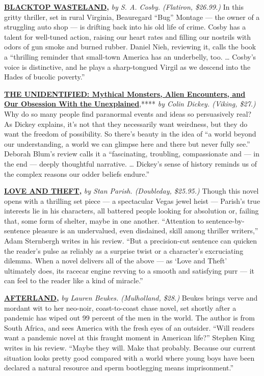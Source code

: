 \href{https://www.nytimes.com/2020/07/17/books/review/blacktop-wasteland-s-a-cosby.html}{\textbf{\textbf{BLACKTOP
WASTELAND}}}\textbf{\textbf{,}} \emph{by S. A. Cosby. (Flatiron,
\$26.99.)} In this gritty thriller, set in rural Virginia, Beauregard
``Bug'' Montage --- the owner of a struggling auto shop --- is drifting
back into his old life of crime. Cosby has a talent for well-tuned
action, raising our heart rates and filling our nostrils with odors of
gun smoke and burned rubber. Daniel Nieh, reviewing it, calls the book a
``thrilling reminder that small-town America has an underbelly, too.
\ldots{} Cosby's voice is distinctive, and he plays a sharp-tongued
Virgil as we descend into the Hades of bucolic poverty.''

\textbf{\href{https://www.nytimes.com/2020/07/21/books/review/the-unidentified-colin-dickey.html}{\textbf{THE
UNIDENTIFIED: Mythical Monsters, Alien Encounters, and Our Obsession
With the Unexplained}}},**** \emph{by Colin Dickey. (Viking, \$27.)} Why
do so many people find paranormal events and ideas so persuasively real?
As Dickey explains, it's not that they necessarily want weirdness, but
they do want the freedom of possibility. So there's beauty in the idea
of ``a world beyond our understanding, a world we can glimpse here and
there but never fully see.'' Deborah Blum's review calls it a
``fascinating, troubling, compassionate and --- in the end --- deeply
thoughtful narrative. \ldots{} Dickey's sense of history reminds us of
the complex reasons our odder beliefs endure.''

\href{https://www.nytimes.com/2020/07/23/books/review/stan-parish-love-and-theft.html}{\textbf{\textbf{LOVE
AND THEFT}}}\textbf{\textbf{,}} \emph{by Stan Parish. (Doubleday,
\$25.95.)} Though this novel opens with a thrilling set piece --- a
spectacular Vegas jewel heist --- Parish's true interests lie in his
characters, all battered people looking for absolution or, failing that,
some form of shelter, maybe in one another. ``Attention to
sentence-by-sentence pleasure is an undervalued, even disdained, skill
among thriller writers,'' Adam Sternbergh writes in his review. ``But a
precision-cut sentence can quicken the reader's pulse as reliably as a
surprise twist or a character's excruciating dilemma. When a novel
delivers all of the above --- as `Love and Theft' ultimately does, its
racecar engine revving to a smooth and satisfying purr --- it can feel
to the reader like a kind of miracle.''

\href{https://www.nytimes.com/2020/07/24/books/review/lauren-beukes-afterland.html}{\textbf{\textbf{AFTERLAND}}}\textbf{\textbf{,}}
\emph{by Lauren Beukes. (Mulholland, \$28.)} Beukes brings verve and
mordant wit to her neo-noir, coast-to-coast chase novel, set shortly
after a pandemic has wiped out 99 percent of the men in the world. The
author is from South Africa, and sees America with the fresh eyes of an
outsider. ``Will readers want a pandemic novel at this fraught moment in
American life?'' Stephen King writes in his review. ``Maybe they will.
Make that probably. Because our current situation looks pretty good
compared with a world where young boys have been declared a natural
resource and sperm bootlegging means imprisonment.''

